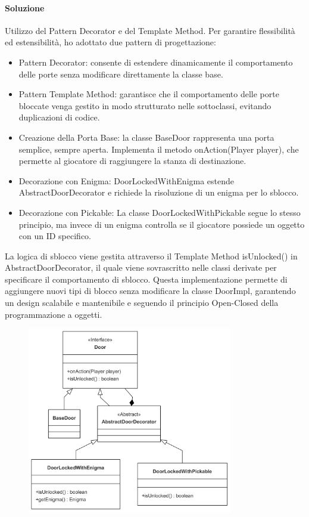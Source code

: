 \documentclass[a4paper,12pt]{report}
\begin{document}
\paragraph{Soluzione} %
Utilizzo del Pattern Decorator e del Template Method.
Per garantire flessibilità ed estensibilità, ho adottato due pattern di progettazione:
\begin{itemize}
	\item Pattern Decorator: consente di estendere dinamicamente il comportamento delle porte senza modificare direttamente la classe base.
	\item Pattern Template Method: garantisce che il comportamento delle porte bloccate venga gestito in modo strutturato nelle sottoclassi, evitando duplicazioni di codice.
\end{itemize}
\begin{itemize}
	\item Creazione della Porta Base: la classe BaseDoor rappresenta una porta semplice, sempre aperta. Implementa il metodo onAction(Player player), che permette al giocatore di raggiungere la stanza di destinazione.
	\item Decorazione con Enigma: DoorLockedWithEnigma estende AbstractDoorDecorator e richiede la risoluzione di un enigma per lo sblocco.
	\item Decorazione con Pickable: La classe DoorLockedWithPickable segue lo stesso principio, ma invece di un enigma controlla se il giocatore possiede un oggetto con un ID specifico.
\end{itemize}
La logica di sblocco viene gestita attraverso il Template Method isUnlocked() in AbstractDoorDecorator, il quale viene sovrascritto nelle classi derivate per specificare il comportamento di sblocco. 
Questa implementazione permette di aggiungere nuovi tipi di blocco senza modificare la classe DoorImpl, garantendo un design scalabile e mantenibile e seguendo il principio Open-Closed della programmazione a oggetti.
\begin{figure}[h]
    \centering
    \includegraphics[width=0.8\textwidth]{img/doors.png}
    \label{img:doors}
\end{figure}
\end{document}
